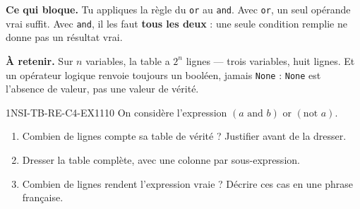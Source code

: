 

\textbf{Ce qui bloque.} Tu appliques la règle du \lstinline{or} au \lstinline{and}. Avec
\lstinline{or}, un seul opérande vrai suffit. Avec \lstinline{and}, il les faut
\textbf{tous les deux} : une seule condition remplie ne donne pas un résultat vrai.

\textbf{À retenir.} Sur $n$ variables, la table a $2^n$ lignes — trois variables, huit lignes.
Et un opérateur logique renvoie toujours un booléen, jamais \lstinline{None} :
\lstinline{None} est l'absence de valeur, pas une valeur de vérité.

\begin{exercice}{1NSI-TB-RE-C4-EX1}{1}{10}
On considère l'expression $(a \text{ and } b) \text{ or } (\text{not } a)$.
\begin{enumerate}
  \item Combien de lignes compte sa table de vérité ? Justifier avant de la dresser.
  \item Dresser la table complète, avec une colonne par sous-expression.
  \item Combien de lignes rendent l'expression vraie ? Décrire ces cas en une phrase française.
\end{enumerate}
\end{exercice}

